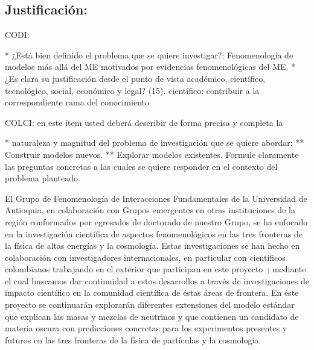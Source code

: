 \subsection{Justificación:                                 }
\begin{instrucciones}
  CODI: 

  * ¿Está bien definido el problema que se quiere investigar?:
  Fenomenología de modelos más allá del ME motivados por evidencias
  fenomenológicas del ME.  
  * ¿Es clara su justificación desde el punto de vista académico,
  científico, tecnológico, social, económico y legal? (15).
  científico: contribuir a la correspondiente rama del conocimiento

  COLCI: en este ítem usted deberá describir de forma precisa y completa la
  
  * naturaleza y magnitud del problema de investigación que se quiere
  abordar:
  ** Construir modelos nuevos.
  ** Explorar modelos existentes.
  Formule claramente las preguntas concretas a las cuales se
  quiere responder en el contexto del problema planteado.
\end{instrucciones}
El Grupo de Fenomenología de Interacciones Fundamentales de la
Universidad de Antioquia, en colaboración con Grupos emergentes en
otras instituciones de la región conformados por egresados de
doctorado de nuestro Grupo, se ha enfocado en la investigación
científica de aspectos fenomenológicos en las tres fronteras de la
física de altas energías y la cosmología. Estas investigaciones se han
hecho en colaboración con investigadores internacionales, en
particular con científicos colombianos trabajando en el exterior que
participan en este
proyecto~\cite{Sierra:2009zq,Sierra:2008wj,AristizabalSierra:2008ye,Choi:2010jt,AristizabalSierra:2009bh};
mediante el cual buscamos dar continuidad a estos desarrollos a través
de investigaciones de impacto científico en la comunidad científica de
éstas áreas de frontera. En éste proyecto se continuarán explorarán
diferentes extensiones del modelo estándar que explican las masas y
mezclas de neutrinos y que contienen un candidato de materia oscura
con predicciones concretas para los experimentos presentes y futuros
en las tres fronteras de la física de partículas y la cosmología. 



